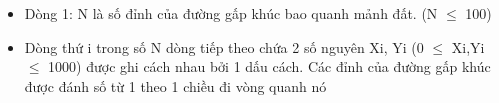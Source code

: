 \begin{itemize}
	\item Dòng 1: N là số đỉnh của đường gấp khúc bao quanh mảnh đất. (N $\le$ 100)
	\item Dòng thứ i trong số N dòng tiếp theo chứa 2 số nguyên Xi, Yi (0 $\le$ Xi,Yi $\le$ 1000) được ghi cách nhau bởi 1 dấu cách. Các đỉnh của đường gấp khúc được đánh số từ 1 theo 1 chiều đi vòng quanh nó
\end{itemize}

\